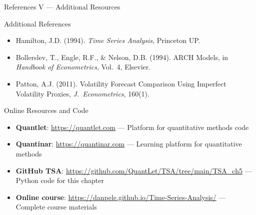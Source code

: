 \documentclass[9pt, aspectratio=169, t]{beamer}
\begin{document}
\begin{frame}{References V --- Additional Resources}
    \begin{block}{Additional References}
        {\small
        \begin{itemize}\setlength{\itemsep}{0pt}
            \item Hamilton, J.D. (1994). \textit{Time Series Analysis}, Princeton UP.
            \item Bollerslev, T., Engle, R.F., \& Nelson, D.B. (1994). ARCH Models, in \textit{Handbook of Econometrics}, Vol.\ 4, Elsevier.
            \item Patton, A.J. (2011). Volatility Forecast Comparison Using Imperfect Volatility Proxies, \textit{J.\ Econometrics}, 160(1).
        \end{itemize}
        }
    \end{block}
    \vspace{-0.15cm}
    \begin{exampleblock}{Online Resources and Code}
        {\small
        \begin{itemize}\setlength{\itemsep}{3pt}
            \item \textbf{Quantlet}: \url{https://quantlet.com} --- Platform for quantitative methods code
            \item \textbf{Quantinar}: \url{https://quantinar.com} --- Learning platform for quantitative methods
            \item \textbf{GitHub TSA}: \url{https://github.com/QuantLet/TSA/tree/main/TSA_ch5} --- Python code for this chapter
            \item \textbf{Online course}: \url{https://danpele.github.io/Time-Series-Analysis/} --- Complete course materials
        \end{itemize}
        }
    \end{exampleblock}
\end{frame}
\end{document}
